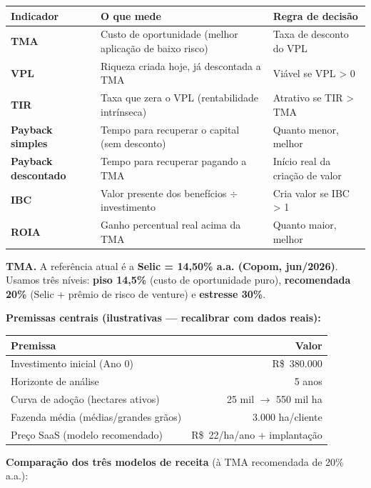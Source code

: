 \documentclass[12pt,a4paper]{article}
\newcommand{\rs}{R\$}
\begin{document}
\begin{table}[h]\small\centering
\begin{tabularx}{\textwidth}{>{\bfseries}l X l}
\toprule
\rowcolor{accent!12} Indicador & O que mede & Regra de decisão \\
\midrule
TMA & Custo de oportunidade (melhor aplicação de baixo risco) & Taxa de desconto do VPL \\
VPL & Riqueza criada hoje, já descontada a TMA & Viável se VPL > 0 \\
TIR & Taxa que zera o VPL (rentabilidade intrínseca) & Atrativo se TIR > TMA \\
Payback simples & Tempo para recuperar o capital (sem desconto) & Quanto menor, melhor \\
Payback descontado & Tempo para recuperar pagando a TMA & Início real da criação de valor \\
IBC & Valor presente dos benefícios $\div$ investimento & Cria valor se IBC > 1 \\
ROIA & Ganho percentual real acima da TMA & Quanto maior, melhor \\
\bottomrule
\end{tabularx}
\end{table}

\textbf{TMA.} A referência atual é a \textbf{Selic = 14,50\% a.a. (Copom, jun/2026)}. Usamos três níveis: \textbf{piso 14,5\%} (custo de oportunidade puro), \textbf{recomendada 20\%} (Selic + prêmio de risco de venture) e \textbf{estresse 30\%}.

\textbf{Premissas centrais (ilustrativas --- recalibrar com dados reais):}

\begin{table}[h]\small\centering
\begin{tabularx}{\textwidth}{X r}
\toprule
\rowcolor{accent!12} Premissa & Valor \\
\midrule
Investimento inicial (Ano 0) & \rs~380.000 \\
Horizonte de análise & 5 anos \\
Curva de adoção (hectares ativos) & 25 mil $\to$ 550 mil ha \\
Fazenda média (médias/grandes grãos) & 3.000 ha/cliente \\
Preço SaaS (modelo recomendado) & \rs~22/ha/ano + implantação \\
\bottomrule
\end{tabularx}
\end{table}

\textbf{Comparação dos três modelos de receita} (à TMA recomendada de 20\% a.a.):
\end{document}
